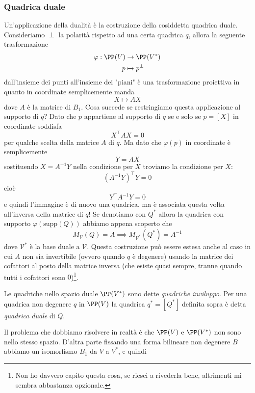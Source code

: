\documentclass[11pt]{scrartcl}
\begin{document}
	\subsubsection{Quadrica duale}
	Un'applicazione della dualità è la costruzione della cosiddetta quadrica duale. Consideriamo $\perp$ la polarità rispetto ad una certa quadrica $q$, allora la seguente trasformazione
	\begin{align*}
		\varphi:\PP(V) &\to \PP(V^*) \\ 
		p & \mapsto p^\perp
	\end{align*}
	dall'insieme dei punti all'insieme dei "piani" è una trasformazione proiettiva in quanto in coordinate semplicemente manda
	$$X\mapsto AX$$
	dove $A$ è la matrice di $B_1$. Cosa succede se restringiamo questa applicazione al supporto di $q$? Dato che $p$ appartiene al supporto di $q$ se e solo se $p=[X]$ in coordinate soddisfa
	$$X^\intercal A X=0$$
	per qualche scelta della matrice $A$ di $q$. Ma dato che $\varphi(p)$ in coordinate è semplicemente
	$$Y=AX$$
	sostituendo $X=A^{-1}Y$ nella condizione per $X$ troviamo la condizione per $X$:
	$$(A^{-1}Y)^\intercal Y=0$$
	cioè
	$$Y^\intercal A^{-1}Y=0$$
	e quindi l'immagine è di nuovo una quadrica, ma è associata questa volta all'inversa della matrice di $q$! Se denotiamo con $Q^*$ allora la quadrica con supporto $\varphi(\text{supp}(Q))$ abbiamo appena scoperto che 
	$$M_\mathcal{V}(Q)=A \implies M_{\mathcal{V}^*}(Q^*)=A^{-1}$$
	dove $\mathcal{V}^*$ è la base duale a $\mathcal{V}$. Questa costruzione può essere estesa anche al caso in cui $A$ non sia invertibile (ovvero quando $q$ è degenere) usando la matrice dei cofattori al posto della matrice inversa (che esiste quasi sempre, tranne quando tutti i cofattori sono $0$)\footnote{Non ho davvero capito questa cosa, se riesci a rivederla bene, altrimenti mi sembra abbastanza opzionale.}.
	\begin{definition}
		Le quadriche nello spazio duale $\PP(V^*)$ sono dette \textit{quadriche inviluppo}. Per una quadrica non degenere $q$ in $\PP(V)$ la quadrica $q^*=[Q^*]$ definita sopra è detta \textit{quadrica duale} di $Q$. 
	\end{definition}
	Il problema che dobbiamo risolvere in realtà è che $\PP(V)$ e $\PP(V^*)$ non sono nello stesso spazio. D'altra parte fissando una forma bilineare non degenere $B$ abbiamo un isomorfismo $B_1$ da $V$ a $V^*$, e quindi
	\begin{center}
	\end{center}
	
\end{document}
